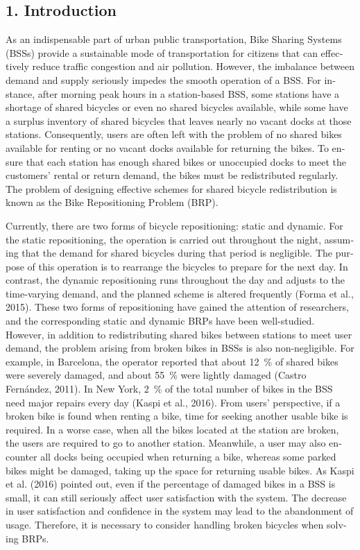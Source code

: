\documentclass[
  english,
]{article}
\begin{document}
\begin{otherlanguage}{english}
\protect{}\label{body}
\protect{}\label{s0005}
\subsection{1. Introduction}\label{st025}

\protect{}\label{p0035}
As an indispensable part of urban public transportation, Bike Sharing Systems (BSSs) provide a
sustainable mode of transportation for citizens that can effectively reduce traffic congestion and
air pollution. However, the imbalance between demand and supply seriously impedes the smooth
operation of a BSS. For instance, after morning peak hours in a station-based BSS, some stations
have a shortage of shared bicycles or even no shared bicycles available, while some have a surplus
inventory of shared bicycles that leaves nearly no vacant docks at those stations. Consequently,
users are often left with the problem of no shared bikes available for renting or no vacant docks
available for returning the bikes. To ensure that each station has enough shared bikes or unoccupied
docks to meet the customers' rental or return demand, the bikes must be redistributed regularly. The
problem of designing effective schemes for shared bicycle redistribution is known as the Bike
Repositioning Problem (BRP).

\protect{}\label{p0040}
Currently, there are two forms of bicycle repositioning: static and dynamic. For the static
repositioning, the operation is carried out throughout the night, assuming that the demand for
shared bicycles during that period is negligible. The purpose of this operation is to rearrange the
bicycles to prepare for the next day. In contrast, the dynamic repositioning runs throughout the day
and adjusts to the time-varying demand, and the planned scheme is altered frequently (Forma et al.,
2015). These two forms of repositioning have gained the attention of researchers, and the
corresponding static and dynamic BRPs have been well-studied. However, in addition to redistributing
shared bikes between stations to meet user demand, the problem arising from broken bikes in BSSs is
also non-negligible. For example, in Barcelona, the operator reported that about 12~\% of shared
bikes were severely damaged, and about 55~\% were lightly damaged (Castro Fernández, 2011). In New
York, 2~\% of the total number of bikes in the BSS need major repairs every day (Kaspi et al.,
2016). From users' perspective, if a broken bike is found when renting a bike, time for seeking
another usable bike is required. In a worse case, when all the bikes located at the station are
broken, the users are required to go to another station. Meanwhile, a user may also encounter all
docks being occupied when returning a bike, whereas some parked bikes might be damaged, taking up
the space for returning usable bikes. As Kaspi et al. (2016) pointed out, even if the percentage of
damaged bikes in a BSS is small, it can still seriously affect user satisfaction with the system.
The decrease in user satisfaction and confidence in the system may lead to the abandonment of usage.
Therefore, it is necessary to consider handling broken bicycles when solving BRPs.


\end{otherlanguage}
\end{document}
